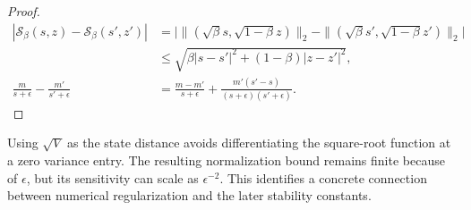 \begin{proof}
\begin{align}
 |\mathcal S_\beta(s,z)-\mathcal S_\beta(s',z')|
 &=\big|\|(\sqrt\beta s,\sqrt{1-\beta}z)\|_2
       -\|(\sqrt\beta s',\sqrt{1-\beta}z')\|_2\big|\\
 &\le\sqrt{\beta|s-s'|^2+(1-\beta)|z-z'|^2},\\
 \frac{m}{s+\epsilon}-\frac{m'}{s'+\epsilon}
 &=\frac{m-m'}{s+\epsilon}
   +\frac{m'(s'-s)}{(s+\epsilon)(s'+\epsilon)}.
\end{align}
\end{proof}
Using $\sqrt V$ as the state distance avoids differentiating the square-root
function at a zero variance entry. The resulting normalization bound remains
finite because of $\epsilon$, but its sensitivity can scale as
$\epsilon^{-2}$. This identifies a concrete connection between numerical
regularization and the later stability constants.

